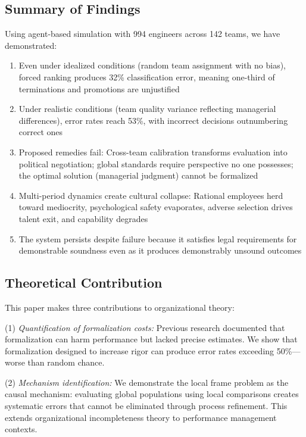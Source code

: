 \documentclass[12pt]{article}
\begin{document}
\subsection{Summary of Findings}

Using agent-based simulation with 994 engineers across 142 teams, we have demonstrated:

\begin{enumerate}
\item Even under idealized conditions (random team assignment with no bias), forced ranking produces 32\% classification error, meaning one-third of terminations and promotions are unjustified

\item Under realistic conditions (team quality variance reflecting managerial differences), error rates reach 53\%, with incorrect decisions outnumbering correct ones

\item Proposed remedies fail: Cross-team calibration transforms evaluation into political negotiation; global standards require perspective no one possesses; the optimal solution (managerial judgment) cannot be formalized

\item Multi-period dynamics create cultural collapse: Rational employees herd toward mediocrity, psychological safety evaporates, adverse selection drives talent exit, and capability degrades

\item The system persists despite failure because it satisfies legal requirements for demonstrable soundness even as it produces demonstrably unsound outcomes
\end{enumerate}

\subsection{Theoretical Contribution}

This paper makes three contributions to organizational theory:

(1) \emph{Quantification of formalization costs:} Previous research documented that formalization can harm performance \citep{pfeffer2001fighting, eichenwald2012microsoft, wijayanti2023systematic} but lacked precise estimates. We show that formalization designed to increase rigor can produce error rates exceeding 50\%---worse than random chance.

(2) \emph{Mechanism identification:} We demonstrate the local frame problem as the causal mechanism: evaluating global populations using local comparisons creates systematic errors that cannot be eliminated through process refinement. This extends organizational incompleteness theory to performance management contexts.
\end{document}
